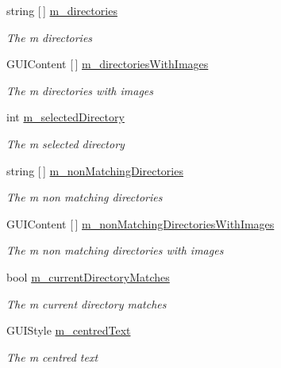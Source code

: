 \begin{DoxyCompactItemize}
string \mbox{[}$\,$\mbox{]} \hyperlink{class_lerp2_a_p_i_1_1_utility_1_1_file_browser_acdbfe34febe35bc607a293f664d99d7a}{m\+\_\+directories}
\begin{DoxyCompactList}\small\item\em The m directories \end{DoxyCompactList}\item 
G\+U\+I\+Content \mbox{[}$\,$\mbox{]} \hyperlink{class_lerp2_a_p_i_1_1_utility_1_1_file_browser_a3a0bb4f65e9f590014d8efbb3ebbd2a1}{m\+\_\+directories\+With\+Images}
\begin{DoxyCompactList}\small\item\em The m directories with images \end{DoxyCompactList}\item 
int \hyperlink{class_lerp2_a_p_i_1_1_utility_1_1_file_browser_a660ced9de79b1deca988df8152b83220}{m\+\_\+selected\+Directory}
\begin{DoxyCompactList}\small\item\em The m selected directory \end{DoxyCompactList}\item 
string \mbox{[}$\,$\mbox{]} \hyperlink{class_lerp2_a_p_i_1_1_utility_1_1_file_browser_a5c887c658da4f55cc257d1990b48062a}{m\+\_\+non\+Matching\+Directories}
\begin{DoxyCompactList}\small\item\em The m non matching directories \end{DoxyCompactList}\item 
G\+U\+I\+Content \mbox{[}$\,$\mbox{]} \hyperlink{class_lerp2_a_p_i_1_1_utility_1_1_file_browser_a3a6135dd852623a0dd311c6c5f3378e9}{m\+\_\+non\+Matching\+Directories\+With\+Images}
\begin{DoxyCompactList}\small\item\em The m non matching directories with images \end{DoxyCompactList}\item 
bool \hyperlink{class_lerp2_a_p_i_1_1_utility_1_1_file_browser_a3b1b72f10b7fdf6b3fe8c3c1fdd60b24}{m\+\_\+current\+Directory\+Matches}
\begin{DoxyCompactList}\small\item\em The m current directory matches \end{DoxyCompactList}\item 
G\+U\+I\+Style \hyperlink{class_lerp2_a_p_i_1_1_utility_1_1_file_browser_af6a10e7a0c942f95ccfa714e516f1cf6}{m\+\_\+centred\+Text}
\begin{DoxyCompactList}\small\item\em The m centred text \end{DoxyCompactList}\item 

\end{DoxyCompactItemize}
